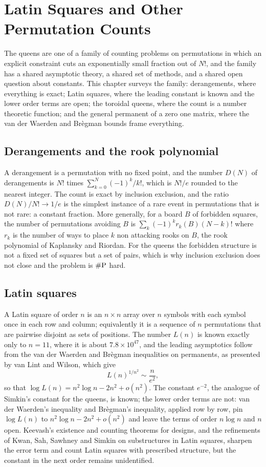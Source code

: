 \chapter{Latin Squares and Other Permutation Counts}
\label{ch:latin}

The queens are one of a family of counting problems on permutations in which an explicit constraint cuts an exponentially small fraction out of $N!$, and the family has a shared asymptotic theory, a shared set of methods, and a shared open question about constants. This chapter surveys the family: derangements, where everything is exact; Latin squares, where the leading constant is known and the lower order terms are open; the toroidal queens, where the count is a number theoretic function; and the general permanent of a zero one matrix, where the van der Waerden and Br\`egman bounds frame everything.

\section{Derangements and the rook polynomial}

A derangement is a permutation with no fixed point, and the number $D(N)$ of derangements is $N!$ times $\sum_{k=0}^{N} (-1)^k / k!$, which is $N!/e$ rounded to the nearest integer. The count is exact by inclusion exclusion, and the ratio $D(N)/N! \to 1/e$ is the simplest instance of a rare event in permutations that is not rare: a constant fraction. More generally, for a board $B$ of forbidden squares, the number of permutations avoiding $B$ is $\sum_k (-1)^k r_k(B) (N - k)!$ where $r_k$ is the number of ways to place $k$ non attacking rooks on $B$, the rook polynomial of Kaplansky and Riordan. For the queens the forbidden structure is not a fixed set of squares but a set of pairs, which is why inclusion exclusion does not close and the problem is $\#\mathrm{P}$ hard.

\section{Latin squares}

A Latin square of order $n$ is an $n \times n$ array over $n$ symbols with each symbol once in each row and column; equivalently it is a sequence of $n$ permutations that are pairwise disjoint as sets of positions. The number $L(n)$ is known exactly only to $n = 11$, where it is about $7.8 \times 10^{47}$, and the leading asymptotics follow from the van der Waerden and Br\`egman inequalities on permanents, as presented by van Lint and Wilson, which give
\[
L(n)^{1/n^2} \sim \frac{n}{e^2} ,
\]
so that $\log L(n) = n^2 \log n - 2 n^2 + o(n^2)$. The constant $e^{-2}$, the analogue of Simkin's constant for the queens, is known; the lower order terms are not: van der Waerden's inequality and Br\`egman's inequality, applied row by row, pin $\log L(n)$ to $n^2 \log n - 2n^2 + o(n^2)$ and leave the terms of order $n \log n$ and $n$ open. Keevash's existence and counting theorems for designs, and the refinements of Kwan, Sah, Sawhney and Simkin on substructures in Latin squares, sharpen the error term and count Latin squares with prescribed structure, but the constant in the next order remains unidentified.

